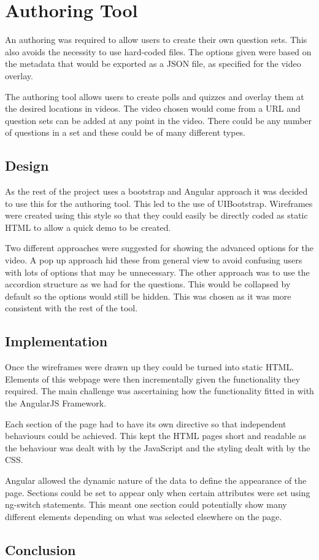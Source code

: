 \chapter{Authoring Tool} 
\label{Chapter:Authoring Tool}
An \gls{authoring} was required to allow users to create their own question sets. This also avoids the necessity to use hard-coded files. The options given were based on the metadata that would be exported as a JSON file, as specified for the video overlay.

The authoring tool allows users to create polls and quizzes and overlay them at the desired locations in videos. The video chosen would come from a URL and question sets can be added at any point in the video. There could be any number of questions in a set and these could be of many different types.
\section{Design} 
\label{Section:Design}
As the rest of the project uses a bootstrap and Angular approach it was decided to use this for the authoring tool. This led to the use of UIBootstrap. Wireframes were created using this style so that they could easily be directly coded as static HTML to allow a quick demo to be created. 

Two different approaches were suggested for showing the advanced options for the video. A pop up approach hid these from general view to avoid confusing users with lots of options that may be unnecessary. The other approach was to use the accordion structure as we had for the questions. This would be collapsed by default so the options would still be hidden. This was chosen as it was more consistent with the rest of the tool.

\section{Implementation}
\label{Section:Implementation}
Once the wireframes were drawn up they could be turned into static HTML. Elements of this webpage were then incrementally given the functionality they required. The main challenge was ascertaining how the functionality fitted in with the \gls{AngularJS} Framework. 

Each section of the page had to have its own directive so that independent behaviours could be achieved. This kept the HTML pages short and readable as the behaviour was dealt with by the JavaScript and the styling dealt with by the \gls{CSS}.

Angular allowed the dynamic nature of the data to define the appearance of the page. Sections could be set to appear only when certain attributes were set using ng-switch statements. This meant one section could potentially show many different elements depending on what was selected elsewhere on the page.

\section{Conclusion}